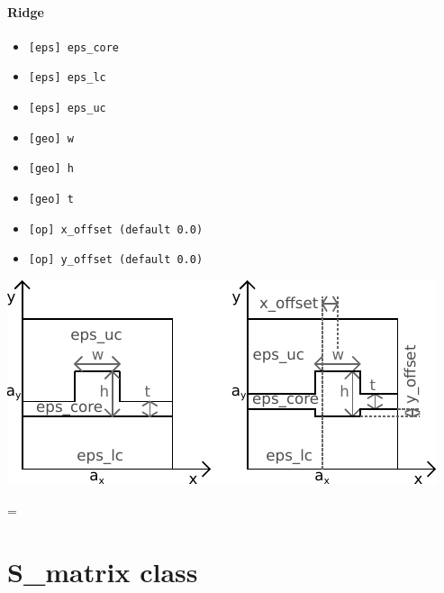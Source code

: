 \documentclass[a4paper,10pt]{report}
\newenvironment{absolutelynopagebreak}
  {\par\nobreak\vfil\penalty0\vfilneg
   \vtop\bgroup}
  {\par\xdef\tpd{\the\prevdepth}\egroup
   \prevdepth=\tpd}
\begin{document}
\begin{absolutelynopagebreak}
\paragraph{Ridge}
\begin{itemize}[noitemsep,topsep=0pt,parsep=0pt,partopsep=0pt]
\item \texttt{[eps] eps\_core}
\item \texttt{[eps] eps\_lc}
\item \texttt{[eps] eps\_uc}
\item \texttt{[geo] w}
\item \texttt{[geo] h}
\item \texttt{[geo] t}
\item \texttt{[op] x\_offset (default 0.0)} 
\item \texttt{[op] y\_offset (default 0.0)} 
\end{itemize}
\includegraphics[width=\textwidth]{figures/cr_ridge.pdf}
\end{absolutelynopagebreak}

\newpage


\section{S\_matrix class}
\end{document}
